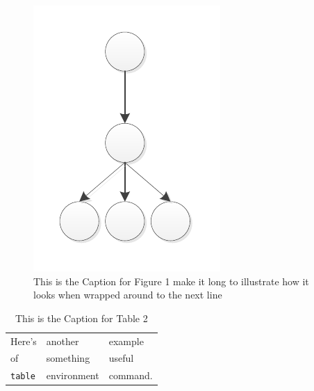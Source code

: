 \documentclass{thesis}
\begin{document}
 
\begin{figure}
\centering
\vspace{2.0in} 
\includegraphics{Drawing4}  
\caption{This is the Caption for Figure 1 make it long to illustrate
   how it looks when wrapped around to the next line}
\label{Figure 1}  %
\end{figure}


\begin{table}
\caption{This is the Caption for Table 2}
\label{mytable}
\begin{center}
\begin{tabular}{lll}
Here's	& another 	& example \\
of		& something	& useful \\
\verb+table+ & environment & command. \end{tabular}
\end{center}
\end{table}
\end{document}
